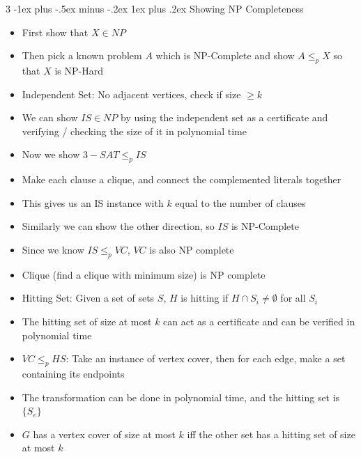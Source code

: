 \documentclass[10pt, landscape]{article}
\makeatletter
\renewcommand{\subsection}{\@startsection{subsection}{3}{0mm}%
                                {-1ex plus -.5ex minus -.2ex}%
                                {1ex plus .2ex}%
                                {\normalfont\small\bfseries}}%
\makeatother
\begin{document}
\begin{multicols*}{3}
\subsection{Showing NP Completeness}
\begin{itemize}
    \item First show that $X \in NP$
    \item Then pick a known problem $A$ which is NP-Complete and show $A \leq_p X$ so that $X$ is NP-Hard
    \item Independent Set: No adjacent vertices, check if size $\geq k$
    \item We can show $IS \in NP$ by using the independent set as a certificate and verifying / checking the size of it in polynomial time
    \item Now we show $3-SAT \leq_p IS$
    \item Make each clause a clique, and connect the complemented literals together
    \item This gives us an IS instance with $k$ equal to the number of clauses
    \item Similarly we can show the other direction, so $IS$ is NP-Complete
    \item Since we know $IS \leq_p VC$, $VC$ is also NP complete
    \item Clique (find a clique with minimum size) is NP complete
    \item Hitting Set: Given a set of sets $S$, $H$ is hitting if $H \cap S_i \neq \emptyset$ for all $S_i$
    \item The hitting set of size at most $k$ can act as a certificate and can be verified in polynomial time
    \item $VC \leq_p HS$: Take an instance of vertex cover, then for each edge, make a set containing its endpoints
    \item The transformation can be done in polynomial time, and the hitting set is $\{S_e\}$
    \item $G$ has a vertex cover of size at most $k$ iff the other set has a hitting set of size at most $k$
\end{itemize}


\end{multicols*}
\end{document}
